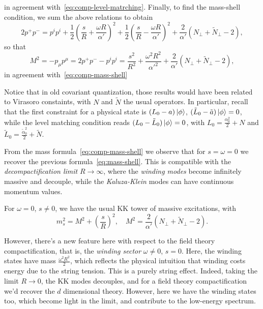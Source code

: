 \begin{mdframed}
\begin{innerproof}
\begin{equation*}
    \end{equation*}
    in agreement with~\eqref{eq:comp-level-matrching}. Finally, to find the mass-shell condition, we sum the above relations to obtain
    \begin{equation*}
        2p^+p^- = p^i p^i + \frac{1}{2} \left( \frac{s}{R} + \frac{\omega R}{\alpha'} \right)^2 + \frac{1}{2} \left( \frac{s}{R} - \frac{\omega R}{\alpha'} \right)^2 + \frac{2}{\alpha'} (N_\perp + \tilde{N}_\perp - 2),
    \end{equation*}
    so that
    \begin{equation}
        M^2 = -p_\mu p^\mu = 2 p^+ p^- - p^i p^i = \frac{s^2}{R^2} + \frac{\omega^2 R^2}{\alpha'^2} + \frac{2}{\alpha'} (N_\perp + \tilde{N}_\perp - 2),
    \end{equation}
    in agreement with~\eqref{eq:comp-mass-shell}
\end{innerproof}
\end{mdframed}

Notice that in old covariant quantization, those results would have been related to Virasoro constaints, with $N$ and $\tilde{N}$ the usual operators. In particular, recall that the first constraint for a physical state is $(L_0 -a) \ket{\phi}$, $(\tilde{L}_0 - \tilde{a}) \ket{\phi} = 0$, while the level matching condition reads $(L_0 - \tilde{L}_0) \ket{\phi} = 0$, with $L_0 = \frac{\alpha^2_0}{2} + N$ and $\tilde{L}_0 = \frac{\tilde{\alpha}^2_0}{2} + \tilde{N}$.

From the mass formula~\eqref{eq:comp-mass-shell} we observe that for $s = \omega = 0$ we recover the previous formula~\eqref{eq:mass-shell}. This is compatible with the \emph{decompactification limit} $R \to \infty$, where the \emph{winding modes} become infinitely massive and decouple, while the \emph{Kaluza-Klein} modes can have continuous momentum values. 

For $\omega = 0$, $s\neq 0$, we have the usual KK tower of massive excitations, with
\begin{equation}
    m_s^2 = M^2 + \left(\frac{s}{R}\right)^2, \quad M^2 = \frac{2}{\alpha'} (N_\perp + \tilde{N}_\perp - 2) .
\end{equation}

However, there's a new feature here with respect to the field theory compactification, that is, the \emph{winding sector} $\omega \neq 0$, $s = 0$. Here, the winding states have mass $\frac{\omega^2 R^2}{2}$, which reflects the physical intuition that winding costs energy due to the string tension. This is a purely string effect. Indeed, taking the limit $R \to 0$, the KK modes decouples, and for a field theory compactification we'd recover the $d$ dimensional theory. However, here we have the winding states too, which become light in the limit, and contribute to the low-energy spectrum.

